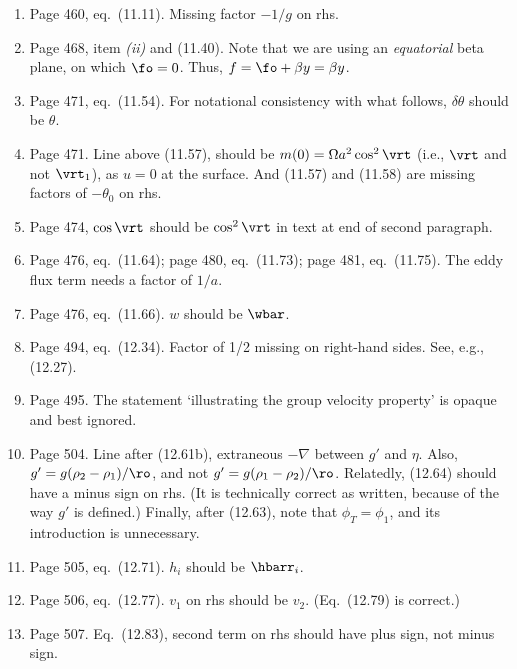 \documentclass[10pt]{article}
\newcommand{\eq}{eq.\ } \newcommand{\Eq}{Eq.\ }
\begin{document}
\begin{enumerate}
\item Page 460, \eq (11.11). Missing factor $-1/g$ on rhs.

\item Page 468, item \textit{(ii)} and (11.40). Note that we are using an \textit{equatorial} beta plane, on which $\fo=0$. Thus, $f=\fo + \beta y = \beta y$.

\item Page  471, \eq (11.54). For notational consistency with what follows, $\delta \theta$ should be $\theta$.

\item Page 471. Line above (11.57), should be $m(0) = \Omega a^2 \cos^2 \vrt$ (i.e., $\vrt$ and not $\vrt_1$), as $u=0$ at the surface. And (11.57) and (11.58) are missing factors of $-\theta_0$ on rhs.

\item Page 474, $\cos \vrt$ should be $\cos^2 \vrt$ in text at end of second paragraph.

\item Page 476, \eq (11.64); page 480, \eq (11.73);  page 481, \eq(11.75). The eddy flux term needs a factor of $1/a$.

\item Page 476, \eq (11.66). $w$ should be $\wbar$.

 \item Page 494, \eq (12.34). Factor of 1/2 missing on right-hand sides. See, e.g., (12.27).

 \item Page 495. The statement `illustrating the group velocity property' is opaque and best ignored.

\item Page 504. Line after (12.61b), extraneous $-\nabla$ between $g'$ and $\eta$. Also, $g' = g (\rho_2-\rho_1)/\ro$, and not $g' = g (\rho_1-\rho_2)/\ro$. Relatedly, (12.64) should have a minus sign on rhs. (It is technically correct as written, because of the way $g'$ is defined.) Finally, after (12.63), note that $\phi_T = \phi_1$, and its introduction is unnecessary.

\item Page 505, \eq(12.71). $h_i$ should be $\hbarr_i$.

\item Page 506, \eq (12.77). $v_1$ on rhs should be $v_2$. (Eq.\ (12.79) is correct.)

\item Page 507. \Eq (12.83), second term on rhs should have plus sign, not minus sign.


\end{enumerate}
\end{document}
